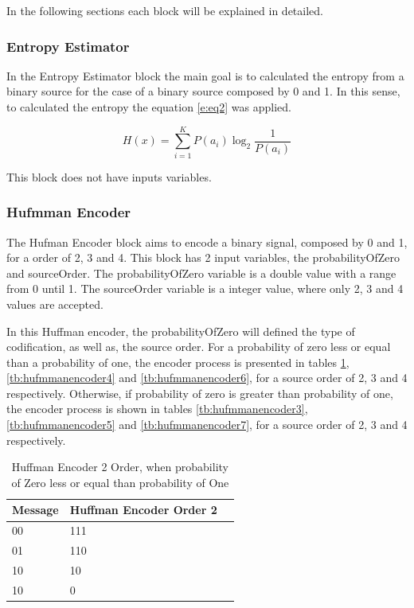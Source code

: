 \begin{refsection}
In the following sections each block will be explained in detailed.


\subsubsection{Entropy Estimator}
In the Entropy Estimator block the main goal is to calculated the entropy from a binary source for the case of a binary source composed by 0 and 1. In this sense, to calculated the entropy the equation \ref{e:eq2} was applied.


\begin{equation}
H(x)=\sum_{i=1}^K P(a_{i})  \log_2\frac{1}{P(a_{i})}
 \label{e:eq2}
\end{equation}

This block does not have inputs variables.

\subsubsection{Hufmman Encoder}
The Hufman Encoder block aims to encode a binary signal, composed by 0 and 1, for a order of 2, 3 and 4. This block has 2 input variables, the probabilityOfZero and sourceOrder. 
The probabilityOfZero variable is a double value with a range from 0 until 1. The sourceOrder variable is a integer value, where only 2, 3 and 4 values are accepted.

In this Huffman encoder, the probabilityOfZero will defined the type of codification, as well as, the source order. For a probability of zero less or equal than a probability of one, the encoder process is presented in tables \ref{tb:hufmmanencoder2}, \ref{tb:hufmmanencoder4} and \ref{tb:hufmmanencoder6}, for a source order of 2, 3 and 4 respectively.
Otherwise, if probability of zero is greater than probability of one, the encoder process is shown in tables \ref{tb:hufmmanencoder3}, \ref{tb:hufmmanencoder5} and \ref{tb:hufmmanencoder7}, for a source order of 2, 3 and 4 respectively.

\begin{table}[H]
\centering
\caption{Huffman Encoder 2 Order, when probability of Zero less or equal than probability of One}
\label{tb:hufmmanencoder2}
\begin{tabular}{|l|l|l|}
\hline
\textbf{Message}                      & \textbf{Huffman Encoder Order 2}                                       \\ \hline
00                 & 111                                                          \\ \hline
01                 & 110                                                          \\ \hline
10                 & 10                                                         \\ \hline
10                 & 0                                                         \\ \hline


\end{tabular}
\end{table}
\end{refsection}
